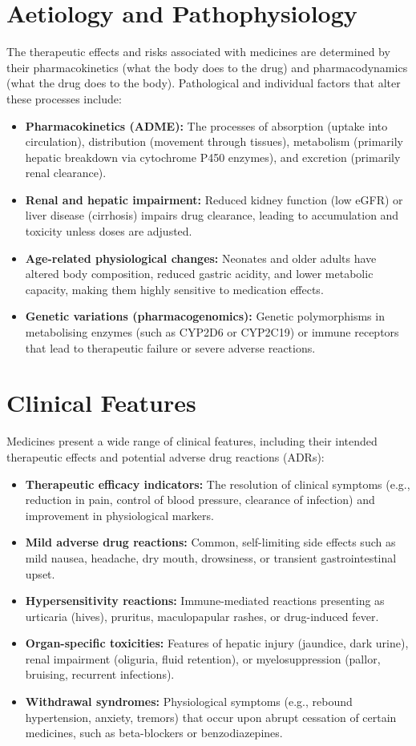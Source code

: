\section*{Aetiology and Pathophysiology}
The therapeutic effects and risks associated with medicines are determined by their pharmacokinetics (what the body does to the drug) and pharmacodynamics (what the drug does to the body). Pathological and individual factors that alter these processes include:
\begin{itemize}
    \item \textbf{Pharmacokinetics (ADME):} The processes of absorption (uptake into circulation), distribution (movement through tissues), metabolism (primarily hepatic breakdown via cytochrome P450 enzymes), and excretion (primarily renal clearance).
    \item \textbf{Renal and hepatic impairment:} Reduced kidney function (low eGFR) or liver disease (cirrhosis) impairs drug clearance, leading to accumulation and toxicity unless doses are adjusted.
    \item \textbf{Age-related physiological changes:} Neonates and older adults have altered body composition, reduced gastric acidity, and lower metabolic capacity, making them highly sensitive to medication effects.
    \item \textbf{Genetic variations (pharmacogenomics):} Genetic polymorphisms in metabolising enzymes (such as CYP2D6 or CYP2C19) or immune receptors that lead to therapeutic failure or severe adverse reactions.
\end{itemize}

\section*{Clinical Features}
Medicines present a wide range of clinical features, including their intended therapeutic effects and potential adverse drug reactions (ADRs):
\begin{itemize}
    \item \textbf{Therapeutic efficacy indicators:} The resolution of clinical symptoms (e.g., reduction in pain, control of blood pressure, clearance of infection) and improvement in physiological markers.
    \item \textbf{Mild adverse drug reactions:} Common, self-limiting side effects such as mild nausea, headache, dry mouth, drowsiness, or transient gastrointestinal upset.
    \item \textbf{Hypersensitivity reactions:} Immune-mediated reactions presenting as urticaria (hives), pruritus, maculopapular rashes, or drug-induced fever.
    \item \textbf{Organ-specific toxicities:} Features of hepatic injury (jaundice, dark urine), renal impairment (oliguria, fluid retention), or myelosuppression (pallor, bruising, recurrent infections).
    \item \textbf{Withdrawal syndromes:} Physiological symptoms (e.g., rebound hypertension, anxiety, tremors) that occur upon abrupt cessation of certain medicines, such as beta-blockers or benzodiazepines.
\end{itemize}


